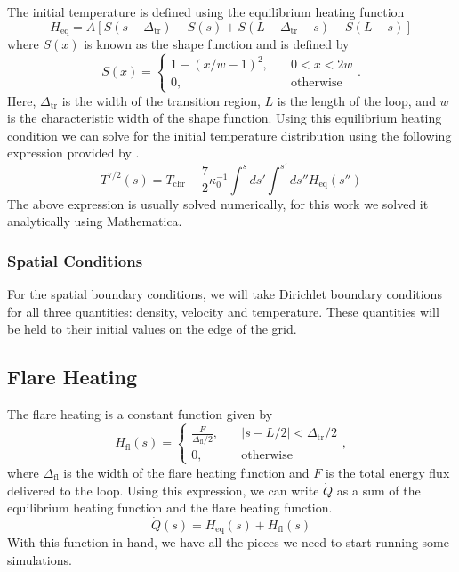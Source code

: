 \documentclass[iop]{emulateapj}
\begin{document}
				The initial temperature is defined using the equilibrium heating function
				\begin{equation}
					H_\text{eq} = A\left[ S(s - \Delta_\text{tr}) - S(s) + S(L - \Delta_\text{tr} - s) - S(L-s) \right] \nonumber
				\end{equation}
				where $S(x)$ is known as the shape function and is defined by
				\begin{equation}
					S(x) = \begin{cases}
						1 - (x/w - 1)^2, \quad &0 < x < 2w \\
						0, &\text{otherwise}
					\end{cases}.
				\end{equation}
				Here, $\Delta_\text{tr}$ is the width of the transition region, $L$ is the length of the loop, and $w$ is the characteristic width of the shape function. Using this equilibrium heating condition we can solve for the initial temperature distribution using the following expression provided by \cite{2014ApJ...795...10L}.
				\begin{equation}
					T^{7/2}(s) = T_\text{chr} - \frac{7}{2} \kappa_0^{-1} \int^s ds' \int^{s'} ds'' H_\text{eq}(s'')
				\end{equation}
				The above expression is usually solved numerically, for this work we solved it analytically using Mathematica.
			\subsubsection{Spatial Conditions}	\label{space_bc}
				For the spatial boundary conditions, we will take Dirichlet boundary conditions for all three quantities: density, velocity and temperature. These quantities will be held to their initial values on the edge of the grid.
				
		\subsection{Flare Heating}
			
			The flare heating is a constant function given by \cite{2014ApJ...795...10L}
			\begin{equation}
				H_\text{fl}(s) = \begin{cases}
					\frac{F}{\Delta_\text{fl}/2}, \quad &|s - L/2| < \Delta_\text{tr}/2 \\
					0, &\text{otherwise}
				\end{cases},
			\end{equation}
			where $\Delta_\text{fl}$ is the width of the flare heating function and $F$ is the total energy flux delivered to the loop.
			Using this expression, we can write $\dot{Q}$ as a sum of the equilibrium heating function and the flare heating function.
			\begin{equation}
				\dot{Q}(s) = H_\text{eq}(s) + H_\text{fl}(s)
			\end{equation}
			With this function in hand, we have all the pieces we need to start running some simulations.
			
\end{document}

